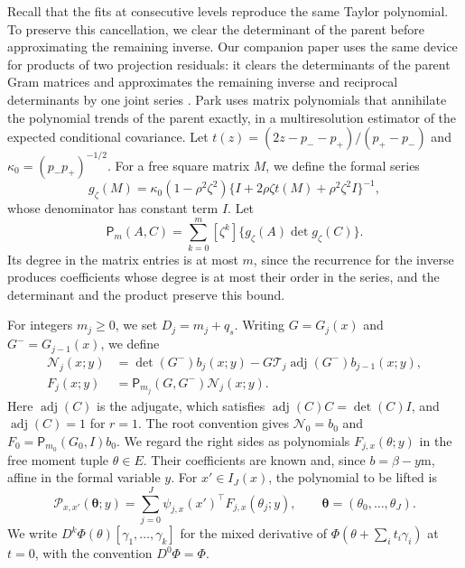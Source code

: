Recall that the fits at consecutive levels reproduce the same Taylor
polynomial. To preserve this cancellation, we clear the determinant of
the parent before approximating the remaining inverse. Our companion
paper uses the same device for products of two projection
residuals: it clears the determinants of the parent Gram matrices and
approximates the remaining inverse and reciprocal determinants by one
joint series \cite[Sections~4.1--4.2]{AronowKallusLopatto2026}. Park
\cite[Section~3.3]{Park2026} uses matrix polynomials that annihilate
the polynomial trends of the parent exactly, in a multiresolution
estimator of the expected conditional covariance.
Let
$t(z)=(2z-p_--p_+)/(p_+-p_-)$ and $\kappa_0=(p_-p_+)^{-1/2}$.
For a free square matrix $M$, we define the formal series
\[
 g_\zeta(M)=\kappa_0(1-\rho^2\zeta^2)
     \{I+2\rho\zeta t(M)+\rho^2\zeta^2I\}^{-1},
\]
whose denominator has constant term $I$. Let
\begin{equation}\label{eq:Udef-Pm}
 \mathsf P_m(A,C)=\sum_{k=0}^m[\zeta^k]
                       \{g_\zeta(A)\det g_\zeta(C)\}.
\end{equation}
Its degree in the matrix entries is at most $m$, since the recurrence
for the inverse produces coefficients whose degree is at most their
order in the series, and the determinant and the product preserve this
bound.

For integers $m_j\ge0$, we set $D_j=m_j+q_s$. Writing
$G=G_j(x)$ and $G^-=G_{j-1}(x)$, we define
\begin{equation}\label{eq:Udef-increment}
\begin{aligned}
 \mathcal N_j(x;y)&=\det(G^-)b_j(x;y)
       -G\mathcal T_j\operatorname{adj}(G^-)b_{j-1}(x;y),\\
 F_j(x;y)&=\mathsf P_{m_j}(G,G^-)\mathcal N_j(x;y).
\end{aligned}
\end{equation}
Here $\operatorname{adj}(C)$ is the adjugate, which satisfies
$\operatorname{adj}(C)C=\det(C)I$, and $\operatorname{adj}(C)=1$ for
$r=1$. The root convention gives
$\mathcal N_0=b_0$ and $F_0=\mathsf P_{m_0}(G_0,I)b_0$.
We regard the right sides as polynomials $F_{j,x}(\theta;y)$ in the
free moment tuple $\theta\in E$. Their
coefficients are known and, since $b=\beta-y\mathrm m$, affine in the
formal variable $y$. For $x'\in I_J(x)$, the polynomial to be lifted
is
\begin{equation}\label{eq:U-affine-polynomial}
 \mathcal P_{x,x'}(\boldsymbol\theta;y)
 =\sum_{j=0}^J\psi_{j,x}(x')^\top F_{j,x}(\theta_j;y),
 \qquad\boldsymbol\theta=(\theta_0,\ldots,\theta_J).
\end{equation}
We write $D^k\Phi(\theta)[\gamma_1,\ldots,\gamma_k]$ for the
mixed derivative of $\Phi(\theta+\sum_i t_i\gamma_i)$ at $t=0$, with
the convention $D^0\Phi=\Phi$.

